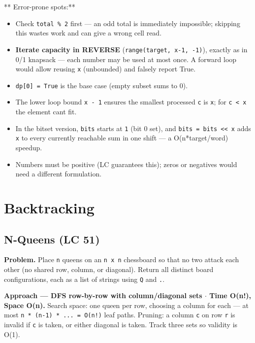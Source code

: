 \documentclass[11pt]{article}
\providecommand{\tightlist}{\setlength{\itemsep}{1pt}\setlength{\parskip}{0pt}}
\begin{document}
** Error-prone spots:**

\begin{itemize}
\tightlist
\item
  Check \texttt{total\ \%\ 2} first --- an odd total is immediately impossible; skipping this wastes work and can give a wrong cell read.
\item
  \textbf{Iterate capacity in REVERSE} (\texttt{range(target,\ x-1,\ -1)}), exactly as in 0/1 knapsack --- each number may be used at most once. A forward loop would allow reusing \texttt{x} (unbounded) and falsely report True.
\item
  \texttt{dp{[}0{]}\ =\ True} is the base case (empty subset sums to 0).
\item
  The lower loop bound \texttt{x\ -\ 1} ensures the smallest processed \texttt{c} is \texttt{x}; for \texttt{c\ \textless{}\ x} the element can\textquotesingle t fit.
\item
  In the bitset version, \texttt{bits} starts at \texttt{1} (bit 0 set), and \texttt{bits\ \textbar{}=\ bits\ \textless{}\textless{}\ x} adds \texttt{x} to every currently reachable sum in one shift --- a O(n*target/word) speedup.
\item
  Numbers must be positive (LC guarantees this); zeros or negatives would need a different formulation.
\end{itemize}

\section{Backtracking}\label{backtracking}

\subsection{N-Queens (LC 51)}\label{n-queens-lc-51}

\textbf{Problem.} Place \texttt{n} queens on an \texttt{n\ x\ n} chessboard so that no two attack each other (no shared row, column, or diagonal). Return all distinct board configurations, each as a list of strings using \texttt{\textquotesingle{}Q\textquotesingle{}} and \texttt{\textquotesingle{}.\textquotesingle{}}.

\textbf{Approach --- DFS row-by-row with column/diagonal sets \(\cdot\) Time O(n!), Space O(n).} Search space: one queen per row, choosing a column for each --- at most \texttt{n\ *\ (n-1)\ *\ ...\ =\ O(n!)} leaf paths. Pruning: a column \texttt{c} on row \texttt{r} is invalid if \texttt{c} is taken, or either diagonal is taken. Track three sets so validity is O(1).
\end{document}
